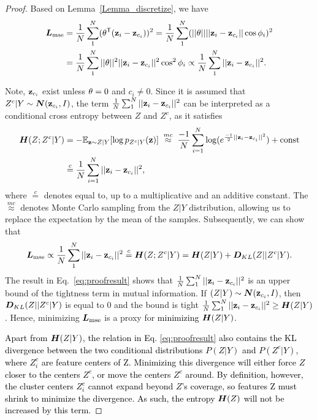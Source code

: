 \documentclass{article} %
\def\shihao{\textcolor{black}}
\begin{document}
\begin{proof}
Based on Lemma~\ref{Lemma_discretize}, we have
\begin{equation}
    \begin{aligned}
    {\bm{L}}_{\text{mse}} &=\frac{1}{N} \sum_{1}^{N}({\theta}^{{\sf T}}({\bf z}_i -{\bf z}_{c_i}))^2 
    = \frac{1}{N} \sum_{1}^{N}(||{\theta}|| ||{\bf z}_i -{\bf z}_{c_i}|| \cos{\phi_i})^2 \\
    & = \frac{1}{N} \sum_{1}^{N}||{\theta}||^2 ||{\bf z}_i -{\bf z}_{c_i}||^2 \cos^2{\phi_i} 
    \propto \frac{1}{N} \sum_{1}^{N}||{\bf z}_i -{\bf z}_{c_i}||^2.
    \label{e_3}
\end{aligned}
\end{equation}


Note, ${\bf z}_{c_i}$ exist unless ${\theta} = 0$ and $c_i \neq 0$.
Since it is assumed that $Z^c | Y \sim {\bm{N}}({\bf z}_{c_i}, I)$, the term $\frac{1}{N} \sum_{1}^{N}||{\bf z}_i -{\bf z}_{c_i}||^2$ can be interpreted as a conditional cross entropy between $Z$ and $Z^c$, as it satisfies
\begin{equation}
    \begin{aligned}
    {\bm{H}}(Z; Z^c |Y) 
    &= -{\mathbb E}_{{\bf z} \sim Z |Y} [\log p_{Z^c |Y}({\bf z}) ] \; \overset{mc}{\approx} \;\frac{-1}{N} \sum_{i=1}^{N} \log (e^{\frac{-1}{2}||{\bf z}_i -{\bf z}_{c_i}||^2}) + \text{const} \\
    &\overset{c}{=} \frac{1}{N} \sum_{i=1}^{N} ||{\bf z}_i -{\bf z}_{c_i}||^2,
\end{aligned}
\end{equation}
where $\overset{c}{=}$ denotes equal to, up to a multiplicative and an additive constant.  The $\overset{mc}{\approx}$ denotes Monte Carlo sampling from the $Z| Y$ distribution, allowing us to replace the expectation by the mean of the samples. Subsequently, we can show that 
\begin{equation}\label{eq:proofresult}
    {\bm{L}}_{\text{mse}} \propto \frac{1}{N} \sum_{1}^{N}||{\bf z}_i -{\bf z}_{c_i}||^2 \overset{c}{=} {\bm{H}}(Z; Z^c |Y) = {\bm{H}}(Z|Y) + {\bm{D}}_{KL}(Z||Z^c |Y).
\end{equation}
The {result} in Eq.~\ref{eq:proofresult} shows that $\frac{1}{N} \sum_{1}^{N}||{\bf z}_i -{\bf z}_{c_i}||^2$ is an upper bound of the tightness term in mutual information.  
If $(Z | Y) \sim {\bm{N}}({\bf z}_{c_i}, I)$, then ${\bm{D}}_{KL}(Z||Z^c |Y)$ is equal to 0 and the bound is tight \ie $\frac{1}{N} \sum_{1}^{N}||{\bf z}_i -{\bf z}_{c_i}||^2 \geq {\bm{H}}(Z|Y)$.
Hence, minimizing ${\bm{L}}_{\text{mse}}$ is a proxy for \shihao{minimizing} ${\bm{H}}(Z|Y)$.


\shihao{Apart from ${\bm{H}}(Z|Y)$, the relation in Eq. \ref{eq:proofresult} also contains the KL divergence between the two conditional distributions $P(Z|Y)$ and $P(Z^c|Y)$, where $Z^c_i$ are feature centers of Z.  Minimizing this divergence will either force $Z$ closer to the centers $Z^c$, or move the centers $Z^c$ around. By definition, however, the cluster centers $Z^{c}_i$ cannot expand beyond $Z$’s coverage, so features Z must shrink to minimize the divergence. As such, the entropy ${\bm{H}}(Z)$ will not be increased by this term.}
\end{proof}
\end{document}

